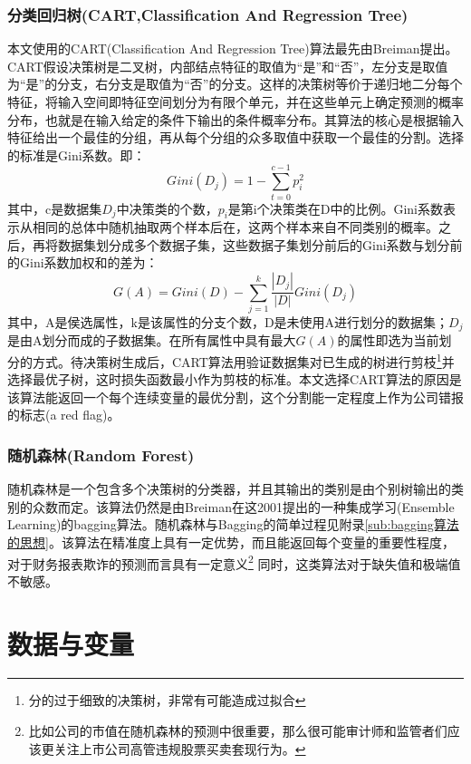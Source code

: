 \documentclass{article}
\begin{document}
\subsubsection{分类回归树(CART,Classification And Regression Tree)}
\par 本文使用的CART(Classification And Regression Tree)算法最先由Breiman\cite{Breiman1984Classification}提出。CART假设决策树是二叉树，内部结点特征的取值为“是”和“否”，左分支是取值为“是”的分支，右分支是取值为“否”的分支。这样的决策树等价于递归地二分每个特征，将输入空间即特征空间划分为有限个单元，并在这些单元上确定预测的概率分布，也就是在输入给定的条件下输出的条件概率分布。其算法的核心是根据输入特征给出一个最佳的分组，再从每个分组的众多取值中获取一个最佳的分割。选择的标准是Gini系数。即：
\begin{equation}
    Gini(D_j) = 1 - \sum_{t=0}^{c-1}p_i^{2}
\end{equation}
其中，c是数据集$D_j$中决策类的个数，$p_i$是第i个决策类在D中的比例。Gini系数表示从相同的总体中随机抽取两个样本后在，这两个样本来自不同类别的概率。之后，再将数据集划分成多个数据子集，这些数据子集划分前后的Gini系数与划分前的Gini系数加权和的差为：
\begin{equation}
    G(A) = Gini(D) - \sum_{j=1}^{k}\frac{|D_j|}{|D|}Gini(D_j)
\end{equation}
其中，A是侯选属性，k是该属性的分支个数，D是未使用A进行划分的数据集；$D_j$是由A划分而成的子数据集。在所有属性中具有最大$G(A)$的属性即选为当前划分的方式。待决策树生成后，CART算法用验证数据集对已生成的树进行剪枝\footnote{分的过于细致的决策树，非常有可能造成过拟合}并选择最优子树，这时损失函数最小作为剪枝的标准。本文选择CART算法的原因是该算法能返回一个每个连续变量的最优分割，这个分割能一定程度上作为公司错报的标志(a red flag)。
\subsubsection{随机森林(Random Forest)}
\par 随机森林是一个包含多个决策树的分类器，并且其输出的类别是由个别树输出的类别的众数而定。该算法仍然是由Breiman\cite{Breiman2001Random}在这2001提出的一种集成学习(Ensemble Learning)的bagging算法。随机森林与Bagging的简单过程见附录\ref{sub:bagging算法的思想}。该算法在精准度上具有一定优势，而且能返回每个变量的重要性程度，对于财务报表欺诈的预测而言具有一定意义\footnote{比如公司的市值在随机森林的预测中很重要，那么很可能审计师和监管者们应该更关注上市公司高管违规股票买卖套现行为。} 同时，这类算法对于缺失值和极端值不敏感。
\section{数据与变量}
\end{document}
